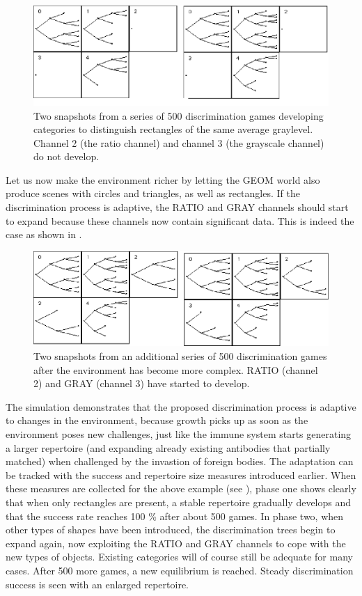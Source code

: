\begin{figure}[htbp]
  \centerline{\includegraphics[width=.65\textwidth]{chap4/figs/adptwrl1}}
\caption{\label{adptwrl1} Two snapshots 
from a series of 500 discrimination 
games developing categories to distinguish rectangles of 
the same average graylevel. Channel 2 (the ratio channel) 
and channel 3 (the grayscale channel) do not develop.}
\end{figure}

Let us now make the environment richer by letting the 
GEOM world also produce scenes with circles and triangles, 
as well as rectangles. If the discrimination 
process is adaptive, the RATIO and GRAY channels should
start to expand because these channels now contain
significant data. This is indeed the case as shown 
in . 

\begin{figure}[htbp]
  \centerline{\includegraphics[width=.65\textwidth]{chap4/figs/adptwrl2}}
\caption{\label{adptwrl2} Two snapshots from 
an additional series of 500 discrimination games after
the environment has become more complex. RATIO
(channel 2) and GRAY (channel 3) have started to develop.}
\end{figure}

The simulation demonstrates
that the proposed discrimination process is adaptive to
changes in the environment, because growth picks up
as soon as the environment poses new challenges, just 
like the immune system starts generating a larger 
repertoire (and expanding already existing antibodies
that partially matched)
when challenged by the invastion of foreign bodies. 
The adaptation can be tracked with the success and 
repertoire size measures introduced earlier. 
When these measures are collected for the above example
(see ), phase one shows clearly that 
when only rectangles are present, a stable 
repertoire gradually develops and that the success rate reaches 100 \%
after about 500 games. In phase two, when other types of 
shapes have been introduced,
the discrimination trees begin to expand again, now exploiting the
RATIO and GRAY channels to cope with the new types of objects.
Existing categories will of course still be adequate for 
many cases. After 500 more games, a new equilibrium
is reached. Steady discrimination success is seen with an 
enlarged repertoire.

